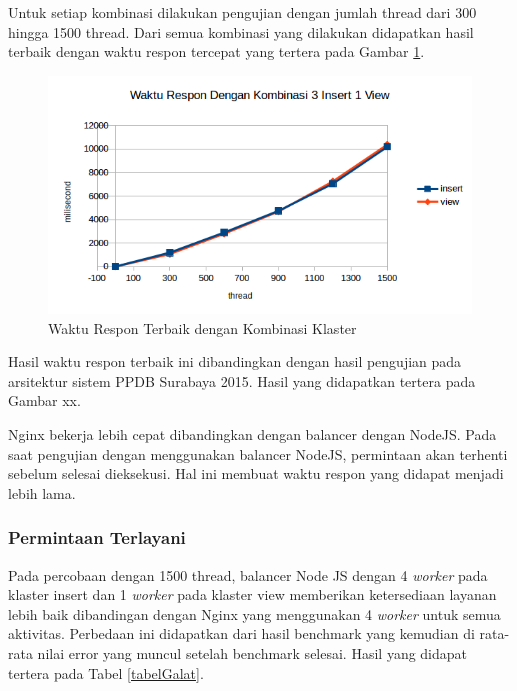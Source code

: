 \documentclass{ta-its}
\begin{document}
					Untuk setiap kombinasi dilakukan pengujian dengan jumlah thread dari 300 hingga 1500 thread. Dari semua kombinasi yang dilakukan didapatkan hasil terbaik dengan waktu respon tercepat yang tertera pada Gambar \ref{gambarResponTerbaik}.
					
					\begin{figure}[h] 
						\centering
						\includegraphics[width=\linewidth]{contoh_img/viewworker2gb}
						\caption{Waktu Respon Terbaik dengan Kombinasi Klaster}
						\label{gambarResponTerbaik}
					\end{figure}
					
					Hasil waktu respon terbaik ini dibandingkan dengan hasil pengujian pada arsitektur sistem PPDB Surabaya 2015. Hasil yang didapatkan tertera pada Gambar xx.
					
					Nginx bekerja lebih cepat dibandingkan dengan balancer dengan NodeJS. Pada saat pengujian dengan menggunakan balancer NodeJS, permintaan akan terhenti sebelum selesai dieksekusi. Hal ini membuat waktu respon yang didapat menjadi lebih lama.
					
				\subsubsection{Permintaan Terlayani}
					Pada percobaan dengan 1500 thread, balancer Node JS dengan 4 \textit{worker} pada klaster insert dan 1 \textit{worker} pada klaster view memberikan ketersediaan layanan lebih baik dibandingan dengan Nginx yang menggunakan 4 \textit{worker} untuk semua aktivitas. Perbedaan ini didapatkan dari hasil benchmark yang kemudian di rata-rata nilai error yang muncul setelah benchmark selesai. Hasil yang didapat
					tertera pada Tabel \ref{tabelGalat}.
					
\end{document}
